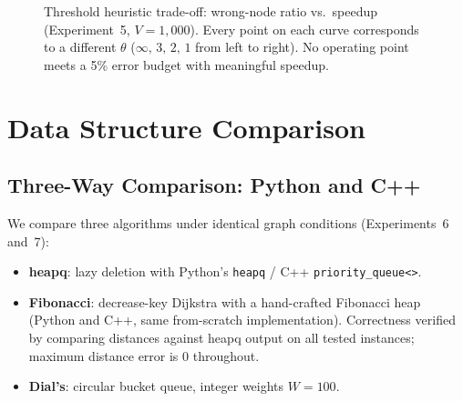 \documentclass[conference]{IEEEtran}
\begin{document}
\begin{figure}[t]
\centering
{}
\caption{Threshold heuristic trade-off: wrong-node ratio vs.\ speedup
(Experiment~5, $V=1{,}000$).  Every point on each curve corresponds to a
different $\theta$ ($\infty,\,3,\,2,\,1$ from left to right).
No operating point meets a 5\% error budget with meaningful speedup.}
\label{fig:threshold}
\end{figure}

\section{Data Structure Comparison}
\label{sec:comparison}

\subsection{Three-Way Comparison: Python and C++}

We compare three algorithms under identical graph conditions
(Experiments~6 and~7):
\begin{itemize}
  \item \textbf{heapq}: lazy deletion with Python's \texttt{heapq} /
        C++ \texttt{priority\_queue<>}.
  \item \textbf{Fibonacci}: decrease-key Dijkstra with a hand-crafted
        Fibonacci heap (Python and C++, same from-scratch implementation).
        Correctness verified by comparing distances against heapq output
        on all tested instances; maximum distance error is $0$ throughout.
  \item \textbf{Dial's}: circular bucket queue, integer weights $W=100$.
\end{itemize}
\end{document}
